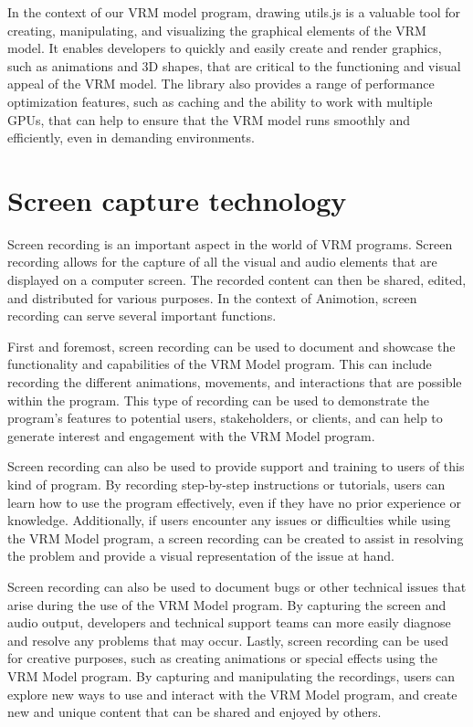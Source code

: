 In the context of our VRM model program, drawing utils.js is a valuable tool for 
creating, manipulating, and visualizing the graphical elements of the VRM model. 
It enables developers to quickly and easily create and render graphics, such as 
animations and 3D shapes, that are critical to the functioning and visual appeal 
of the VRM model. The library also provides a range of performance optimization 
features, such as caching and the ability to work with multiple GPUs, 
that can help to ensure that the VRM model runs smoothly and efficiently, even in demanding environments.

\section{Screen capture technology}
Screen recording is an important aspect in the world of VRM programs. 
Screen recording allows for the capture of all the visual and audio elements that are displayed 
on a computer screen. The recorded content can then be shared, edited, and distributed for various 
purposes. In the context of Animotion, screen recording can serve several important functions.

First and foremost, screen recording can be used to document and showcase the functionality and 
capabilities of the VRM Model program. This can include recording the different animations, movements, 
and interactions that are possible within the program. This type of recording can be used to demonstrate 
the program's features to potential users, stakeholders, or clients, and can help to generate interest 
and engagement with the VRM Model program.

Screen recording can also be used to provide support and training to users of this kind of program. 
By recording step-by-step instructions or tutorials, users can learn how to use the program effectively, 
even if they have no prior experience or knowledge. Additionally, if users encounter any issues or 
difficulties while using the VRM Model program, a screen recording can be created to assist in resolving 
the problem and provide a visual representation of the issue at hand.

Screen recording can also be used to document bugs or other technical issues that arise during the use 
of the VRM Model program. By capturing the screen and audio output, developers and technical support 
teams can more easily diagnose and resolve any problems that may occur.
Lastly, screen recording can be used for creative purposes, such as creating animations or special 
effects using the VRM Model program. By capturing and manipulating the recordings, users can explore 
new ways to use and interact with the VRM Model program, and create new and unique content that 
can be shared and enjoyed by others.

